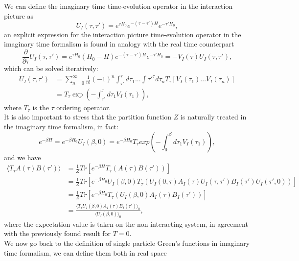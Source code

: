 We can define the imaginary time time-evolution operator in the interaction picture as 
\begin{equation}
    U_I(\tau,\tau')=e^{\tau H_0}e^{-(\tau-\tau')H}e^{-\tau'H_0},
\end{equation}
an explicit expression for the interaction picture time-evolution operator in the imaginary time formalism is found in analogy with 
the real time counterpart
\begin{equation}
    \frac{\partial}{\partial\tau} U_I(\tau,\tau')=e^{\tau H_0}(H_0-H)e^{-(\tau-\tau')H}e^{-\tau'H_0}=-V_I(\tau)U_I(\tau,\tau'),
\end{equation}
which can be solved iteratively:
\begin{equation}
\begin{split}
    U_I(\tau,\tau')&=\sum_{n=0}^\infty\frac{1}{n!}(-1)^n\int_{\tau'}^{\tau}d\tau_1...\int{\tau'}^{\tau}d\tau_nT_\tau\left[V_I(\tau_1)...V_I(\tau_n)\right]\\
    &=T_\tau\exp{\left(-\int_{\tau'}^\tau d\tau_1V_I(\tau_1)\right)},
\end{split}
\end{equation}
where $T_\tau$ is the $\tau$ ordering operator.\\
It is also important to stress that the partition function $Z$ is naturally treated in the imaginary time formalism, in fact:
\begin{equation}
    e^{-\beta H}=e^{-\beta H_0}U_I(\beta,0)=e^{-\beta H_0}T_\tau exp{\left(-\int_{0}^{\beta}d\tau_1V_I(\tau_1)\right)},
\end{equation}
and we have
\begin{equation}
\begin{split}
    \langle T_\tau A(\tau)B(\tau')\rangle &= \frac{1}{Z}Tr\left[e^{-\beta H}T_\tau(A(\tau)B(\tau'))\right]\\
    &=\frac{1}{Z}Tr\left[e^{-\beta H_0}U_I(\beta,0)T_\tau(U_I(0,\tau)A_I(\tau)U_I(\tau,\tau')B_I(\tau')U_I(\tau',0)) \right]\\
    &=\frac{1}{Z}Tr\left[e^{-\beta H_0}T_\tau(U_I(\beta,0)A_I(\tau)B_I(\tau'))\right]\\
    &=\frac{\langle T_\tau U_I(\beta,0)A_I(\tau)B_I(\tau')\rangle_0}{\langle U_I(\beta,0)\rangle_0},
\end{split}
\end{equation}
where the expectation value is taken on the non-interacting system, in agreement with the previously found result for $T=0$.\\
We now go back to the definition of single particle Green's functions in imaginary time formalism, we can define them both in real space 
